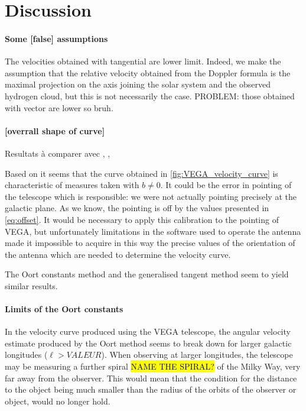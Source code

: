 \section{Discussion}
\paragraph{Some [false] assumptions}
The velocities obtained with tangential are lower limit.
Indeed, we make the assumption that the relative velocity obtained from the Doppler formula is the maximal projection on the axis joining the solar system and the observed hydrogen cloud, but this is not necessarily the case.
PROBLEM: those obtained with vector are lower so bruh.

\paragraph{[overrall shape of curve]}
Resultats à comparer avec \cite{ou_dark_2024}, \cite{jia_research_2022}, \cite{mroz_rotation_2019}

Based on \cite{sakhawat_hossain_salsa_2018} it seems that the curve obtained in \autoref{fig:VEGA_velocity_curve} is characteristic of measures taken with $b \neq 0$. It could be the error in pointing of the telescope which is responsible: we were not actually pointing precisely at the galactic plane. As we know, the pointing is off by the values presented in \autoref{eq:offset}.
It would be necessary to apply this calibration to the pointing of VEGA, but unfortunately limitations in the software used to operate the antenna made it  impossible to acquire in this way the precise values of the orientation of the antenna which are needed to determine the velocity curve.

The Oort constants method and the generalised tangent method seem to yield similar results.

\paragraph{Limits of the Oort constants}
In the velocity curve produced using the VEGA telescope, the angular velocity estimate produced by the Oort method seems to break down for larger galactic longitudes ($\ell > VALEUR$). When observing at larger longitudes, the telescope may be measuring a further spiral \hl{NAME THE SPIRAL?} of the Milky Way, very far away from the observer. This would mean that the condition for the distance to the object being much smaller than the radius of the orbits of the observer or object, would no longer hold. 

